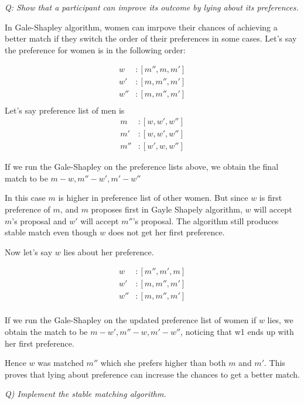 \documentclass{homeworg}
\begin{document}
\newpage

\exercise
\emph{Q: Show that a participant can improve its outcome by lying about its preferences.}

In Gale-Shapley algorithm, women can imrpove their chances of achieving a better match if they switch the order of their preferences in some cases. Let's say the preference for women is in the following order:

\begin{align*}
    w &: [m'' , m , m']\\
    w'&: [m, m'', m']\\
    w''&:[m, m'', m']\\
\end{align*}
Let's say preference list of men is
\begin{align*}
    m &: [w , w' , w'']\\
    m'&:[w , w' , w'']\\
    m''&: [w', w, w'']
\end{align*}

If we run the Gale-Shapley on the preference lists above, we obtain the final match to be $m-w, m''-w', m'-w''$

In this case $m$ is higher in preference list of other women. But since $w$ is first preference of $m$, and $m$ proposes first in Gayle Shapely algorithm, $w$  will accept $m$'s proposal and $w'$ will accept $m''$'s proposal. The algorithm still produces stable match even though $w$ does not get her first preference. 

Now let's say $w$ lies about her preference. 

\begin{align*}
    w &: [m'' , m' , m]\\
    w'&: [m, m'', m']\\
    w''&:[m, m'', m']\\
\end{align*}

If we run the Gale-Shapley on the updated preference list of women if $w$ lies, we obtain the match to be $m-w', m''-w, m'-w''$, noticing that w1 ends up with her first preference.

Hence $w$ was matched $m''$ which she prefers higher than both $m$ and $m'$. This proves that lying about preference can increase the chances to get a better match. 
\newpage

\exercise
\emph{Q) Implement the stable matching algorithm.}
\end{document}
